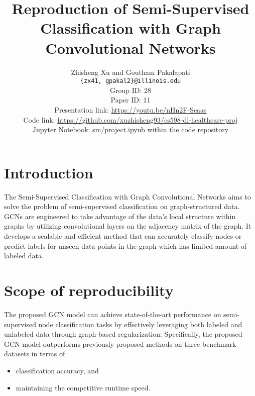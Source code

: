 \documentclass[11pt,a4paper]{article}
\title{Reproduction of Semi-Supervised Classification with Graph Convolutional Networks}
\author{Zhisheng Xu and Goutham Pakalapati\\
  \texttt{\{zx41, gpakal2\}@illinois.edu}
  \\[2em]
  Group ID: 28\\
  Paper ID: 11\\
  Presentation link: \url{https://youtu.be/nHn2F-Seaas} \\
  Code link: \url{https://github.com/xuzhisheng93/cs598-dl-healthcare-proj} \\
  Jupyter Notebook: src/project.ipynb within the code repository
}
\begin{document}
\maketitle


\section{Introduction}

The Semi-Supervised Classification with Graph Convolutional Networks \cite{kipf2017semi} aims to solve the problem of semi-supervised classification on graph-structured data. GCNs are engineered to take advantage of the data's local structure within graphs by utilizing convolutional layers on the adjacency matrix of the graph. It develops a scalable and efficient method that can accurately classify nodes or predict labels for unseen data points in the graph which has limited amount of labeled data.

\section{Scope of reproducibility}

The proposed GCN model can achieve state-of-the-art performance on semi-supervised node classification tasks by effectively leveraging both labeled and unlabeled data through graph-based regularization. Specifically, the proposed GCN model outperforms previously proposed methods on three benchmark datasets in terms of

\begin{itemize}
    \item classification accuracy, and
    \item maintaining the competitive runtime speed.
\end{itemize}

\end{document}
